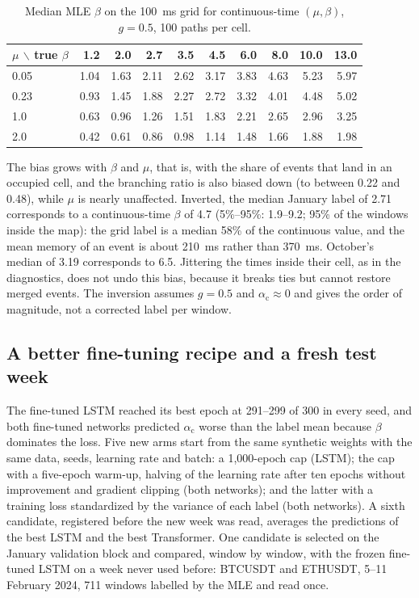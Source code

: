 \documentclass[preprint,12pt,authoryear]{elsarticle}
\newcommand{\across}{\alpha_{\mathrm{c}}}
\begin{document}
\begin{table}[t]
\centering
\caption{Median MLE $\beta$ on the 100~ms grid for continuous-time $(\mu,\beta)$, $g=0.5$,
100 paths per cell.}
\label{tab:grid}
\small
\setlength{\tabcolsep}{4pt}
\begin{tabular}{lrrrrrrrrr}
\toprule
$\mu$ $\backslash$ true $\beta$ & 1.2 & 2.0 & 2.7 & 3.5 & 4.5 & 6.0 & 8.0 & 10.0 & 13.0\\
\midrule
0.05 & 1.04 & 1.63 & 2.11 & 2.62 & 3.17 & 3.83 & 4.63 & 5.23 & 5.97\\
0.23 & 0.93 & 1.45 & 1.88 & 2.27 & 2.72 & 3.32 & 4.01 & 4.48 & 5.02\\
1.0 & 0.63 & 0.96 & 1.26 & 1.51 & 1.83 & 2.21 & 2.65 & 2.96 & 3.25\\
2.0 & 0.42 & 0.61 & 0.86 & 0.98 & 1.14 & 1.48 & 1.66 & 1.88 & 1.98\\
\bottomrule
\end{tabular}
\end{table}

The bias grows with $\beta$ and $\mu$, that is, with the share of events that land in an
occupied cell, and the branching ratio is also biased down (to between 0.22 and 0.48), while
$\mu$ is nearly unaffected. Inverted, the median January label of 2.71 corresponds to a
continuous-time $\beta$ of 4.7 (5\%--95\%: 1.9--9.2; 95\% of the windows inside the map): the
grid label is a median 58\% of the continuous value, and the mean memory of an event is about
210~ms rather than 370~ms. October's median of 3.19 corresponds to 6.5. Jittering the times
inside their cell, as in the diagnostics, does not undo this bias, because it breaks ties but
cannot restore merged events. The inversion assumes $g=0.5$ and $\across\approx0$ and gives
the order of magnitude, not a corrected label per window.

\subsection{A better fine-tuning recipe and a fresh test week}
\label{sec:addendum-recipe}

The fine-tuned LSTM reached its best epoch at 291--299 of 300 in every seed, and both
fine-tuned networks predicted $\across$ worse than the label mean because $\beta$ dominates the
loss. Five new arms start from the same synthetic weights with the same data, seeds, learning
rate and batch: a 1,000-epoch cap (LSTM); the cap with a five-epoch warm-up, halving of the
learning rate after ten epochs without improvement and gradient clipping (both networks); and
the latter with a training loss standardized by the variance of each label (both networks).
A sixth candidate, registered before the new week was read, averages the predictions of the
best LSTM and the best Transformer. One candidate is selected on the January validation block
and compared, window by window, with the frozen fine-tuned LSTM on a week never used before:
BTCUSDT and ETHUSDT, 5--11 February 2024, 711 windows labelled by the MLE and read once.
\end{document}
